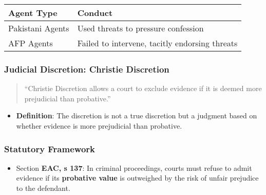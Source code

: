 \begin{longtable}[]{@{}
  >{\raggedright\arraybackslash}p{}
  >{\raggedright\arraybackslash}p{}@{}}
\toprule\noalign{}
\begin{minipage}[b]{\linewidth}\raggedright
Agent Type
\end{minipage} & \begin{minipage}[b]{\linewidth}\raggedright
Conduct
\end{minipage} \\
\midrule\noalign{}
\endhead
\bottomrule\noalign{}
\endlastfoot
Pakistani Agents & Used threats to pressure confession \\
AFP Agents & Failed to intervene, tacitly endorsing threats \\
\end{longtable}

\subsubsection{Judicial Discretion: Christie
Discretion}\label{judicial-discretion-christie-discretion}

\begin{quote}
``Christie Discretion allows a court to exclude evidence if it is deemed
more prejudicial than probative.''
\end{quote}

\begin{itemize}
\tightlist
\item
  \textbf{Definition}: The discretion is not a true discretion but a
  judgment based on whether evidence is more prejudicial than probative.
\end{itemize}

\subsubsection{Statutory Framework}\label{statutory-framework}

\begin{itemize}
\tightlist
\item
  Section \textbf{EAC, s 137}: In criminal proceedings, courts must
  refuse to admit evidence if its \textbf{probative value} is outweighed
  by the risk of unfair prejudice to the defendant.
\end{itemize}

